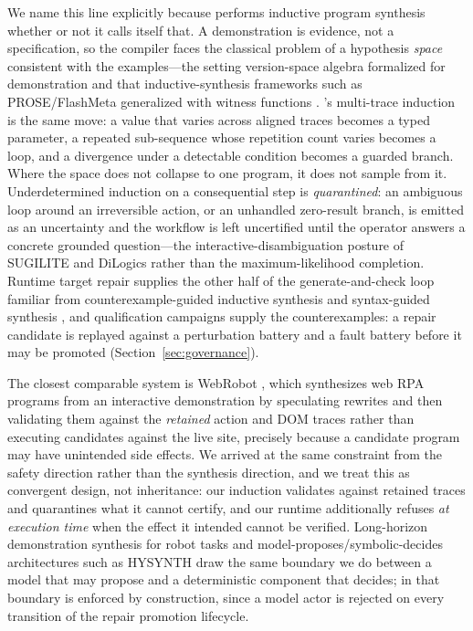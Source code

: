 We name this line explicitly because \system{} performs inductive program
synthesis whether or not it calls itself that. A demonstration is evidence, not
a specification, so the compiler faces the classical problem of a hypothesis
\emph{space} consistent with the examples---the setting version-space algebra
formalized for demonstration \cite{lau2003vsa} and that inductive-synthesis
frameworks such as PROSE/FlashMeta generalized with witness functions
\cite{polozov2015flashmeta}. \system{}'s multi-trace induction is the same move:
a value that varies across aligned traces becomes a typed parameter, a repeated
sub-sequence whose repetition count varies becomes a loop, and a divergence
under a detectable condition becomes a guarded branch. Where the space does not
collapse to one program, it does not sample from it. Underdetermined induction
on a consequential step is \emph{quarantined}: an ambiguous loop around an
irreversible action, or an unhandled zero-result branch, is emitted as an
uncertainty and the workflow is left uncertified until the operator answers a
concrete grounded question---the interactive-disambiguation posture of SUGILITE
and DiLogics \cite{li2017sugilite,pu2023dilogics} rather than the
maximum-likelihood completion. Runtime target repair supplies the other half of
the generate-and-check loop familiar from counterexample-guided inductive
synthesis and syntax-guided synthesis \cite{solarlezama2006sketching,alur2013sygus},
and qualification campaigns supply the counterexamples: a repair candidate is
replayed against a perturbation battery and a fault battery before it may be
promoted (Section~\ref{sec:governance}).

The closest comparable system is WebRobot \cite{dong2022webrobot}, which
synthesizes web RPA programs from an interactive demonstration by speculating
rewrites and then validating them against the \emph{retained} action and DOM
traces rather than executing candidates against the live site, precisely because
a candidate program may have unintended side effects. We arrived at the same
constraint from the safety direction rather than the synthesis direction, and
we treat this as convergent design, not inheritance: our induction validates
against retained traces and quarantines what it cannot certify, and our runtime
additionally refuses \emph{at execution time} when the effect it intended cannot
be verified. Long-horizon demonstration synthesis for robot tasks
\cite{patton2024prolex} and model-proposes/symbolic-decides architectures such as
HYSYNTH \cite{barke2024hysynth} draw the same boundary we do between a model
that may propose and a deterministic component that decides; in \system{} that
boundary is enforced by construction, since a model actor is rejected on every
transition of the repair promotion lifecycle.

